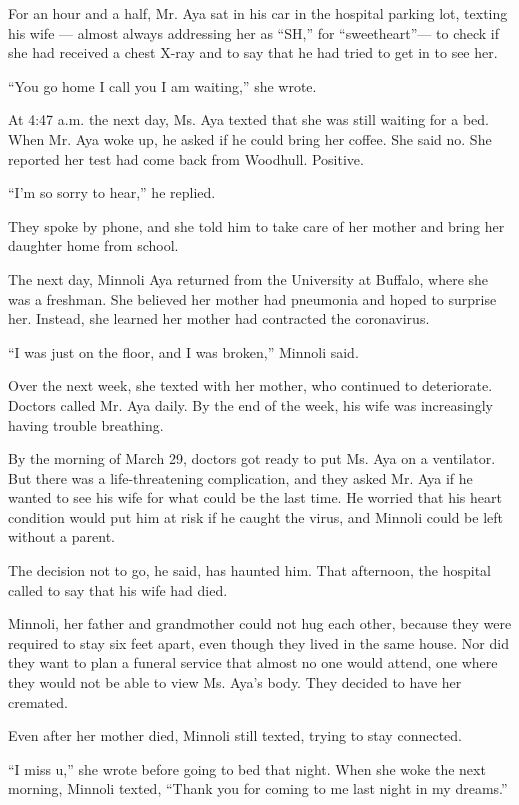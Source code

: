 For an hour and a half, Mr. Aya sat in his car in the hospital parking
lot, texting his wife --- almost always addressing her as ``SH,'' for
``sweetheart''--- to check if she had received a chest X-ray and to say
that he had tried to get in to see her.

``You go home I call you I am waiting,'' she wrote.

At 4:47 a.m. the next day, Ms. Aya texted that she was still waiting for
a bed. When Mr. Aya woke up, he asked if he could bring her coffee. She
said no. She reported her test had come back from Woodhull. Positive.

``I'm so sorry to hear,'' he replied.

They spoke by phone, and she told him to take care of her mother and
bring her daughter home from school.

The next day, Minnoli Aya returned from the University at Buffalo, where
she was a freshman. She believed her mother had pneumonia and hoped to
surprise her. Instead, she learned her mother had contracted the
coronavirus.

``I was just on the floor, and I was broken,'' Minnoli said.

Over the next week, she texted with her mother, who continued to
deteriorate. Doctors called Mr. Aya daily. By the end of the week, his
wife was increasingly having trouble breathing.

By the morning of March 29, doctors got ready to put Ms. Aya on a
ventilator. But there was a life-threatening complication, and they
asked Mr. Aya if he wanted to see his wife for what could be the last
time. He worried that his heart condition would put him at risk if he
caught the virus, and Minnoli could be left without a parent.

The decision not to go, he said, has haunted him. That afternoon, the
hospital called to say that his wife had died.

Minnoli, her father and grandmother could not hug each other, because
they were required to stay six feet apart, even though they lived in the
same house. Nor did they want to plan a funeral service that almost no
one would attend, one where they would not be able to view Ms. Aya's
body. They decided to have her cremated.

Even after her mother died, Minnoli still texted, trying to stay
connected.

``I miss u,'' she wrote before going to bed that night. When she woke
the next morning, Minnoli texted, ``Thank you for coming to me last
night in my dreams.''

